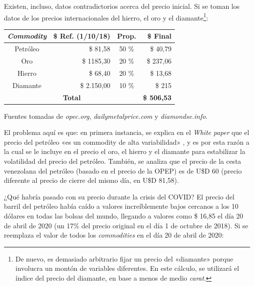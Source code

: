 \documentclass[12pt,a4paper,twoside]{book}
\begin{document}
Existen, incluso, datos contradictorios acerca del precio inicial. Si se toman los datos de los precios internacionales del hierro, el oro y el diamante\footnote{De nuevo, es demasiado arbitrario fijar un precio del «diamante» porque involucra un montón de variables diferentes. En este cálculo, se utilizará el índice del precio del diamante, en base a menos de medio \textit{carat}.}:

\begin{center}
\begin{tabular}{|c|r|c|r|}
\hline 
\textbf{\textit{Commodity}} & \textbf{\$ Ref. (1/10/18)} & \textbf{Prop.} & \textbf{\$ Final} \\ 
\hline 
Petróleo & \$ 81,58 & 50 \% & \$ 40,79 \\ 
\hline 
Oro & \$ 1185,30 & 20 \% & \$ 237,06 \\ 
\hline 
Hierro & \$ 68,40 & 20 \% & \$ 13,68 \\ 
\hline 
Diamante & \$ 2.150,00 & 10 \% & \$ 215 \\ 
\hline 
\multicolumn{3}{|c|}{\textbf{Total}} & \textbf{\$ 506,53} \\ 
\hline 
\end{tabular}
\end{center}
\begin{flushright}
\begin{footnotesize}
Fuentes tomadas de \textit{opec.org}, \textit{dailymetalprice.com} y \textit{diamondse.info}.
\end{footnotesize}
\end{flushright}

El problema aquí es que: en primera instancia, se explica en el \textit{White paper} que el precio del petróleo «es un commodity de alta variabilidad» \cite[pág. 6]{petro:whitepaper}, y es por esta razón a la cual se le incluye en el precio el oro, el hierro y el diamante para estabilizar la volatilidad del precio del petróleo. También, se analiza que el precio de la cesta venezolana del petróleo (basado en el precio de la OPEP) es de U\$D 60 (precio diferente al precio de cierre del mismo día, en U\$D 81,58).

¿Qué habría pasado con su precio durante la crisis del COVID? El precio del barril del petróleo había caído a valores increíblemente bajos cercanos a los 10 dólares en todas las bolsas del mundo, llegando a valores como \$ 16,85 el día 20 de abril de 2020 \cite{petroleo:precio} (un 17\% del precio original en el día 1 de octubre de 2018). Si se reemplaza el valor de todos los \textit{commodities} en el día 20 de abril de 2020:
\end{document}
